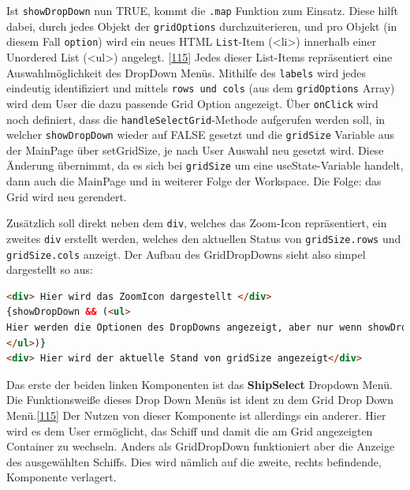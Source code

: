 \documentclass[
    headings=optiontotocandhead,%
    twoside,
    numbers=noenddot,%
    12pt, %
    titlepage, %
    parskip=full, %
    listof=leveldown, 
    numbers=noenddot, %
    a4paper,DIV=14,
    BCOR=15mm,
]{scrbook}
\newcommand{\passthrough}[1]{#1}
\begin{document}
Ist \passthrough{\lstinline!showDropDown!} nun TRUE, kommt die
\passthrough{\lstinline!.map!} Funktion zum Einsatz. Diese hilft dabei,
durch jedes Objekt der \passthrough{\lstinline!gridOptions!}
durchzuiterieren, und pro Objekt (in diesem Fall
\passthrough{\lstinline!option!}) wird ein neues HTML
\passthrough{\lstinline!List!}-Item (\textless li\textgreater) innerhalb
einer Unordered List (\textless ul\textgreater) angelegt.
{[}\protect\hyperlink{ref-Ionos-JS-map}{115}{]} Jedes dieser List-Items
repräsentiert eine Auswahlmöglichkeit des DropDown Menüs. Mithilfe des
\passthrough{\lstinline!labels!} wird jedes eindeutig identifiziert und
mittels \passthrough{\lstinline!rows und cols!} (aus dem
\passthrough{\lstinline!gridOptions!} Array) wird dem User die dazu
passende Grid Option angezeigt. Über \passthrough{\lstinline!onClick!}
wird noch definiert, dass die
\passthrough{\lstinline!handleSelectGrid!}-Methode aufgerufen werden
soll, in welcher \passthrough{\lstinline!showDropDown!} wieder auf FALSE
gesetzt und die \passthrough{\lstinline!gridSize!} Variable aus der
MainPage über setGridSize, je nach User Auswahl neu gesetzt wird. Diese
Änderung übernimmt, da es sich bei \passthrough{\lstinline!gridSize!} um
eine useState-Variable handelt, dann auch die MainPage und in weiterer
Folge der Workspace. Die Folge: das Grid wird neu gerendert.

Zusätzlich soll direkt neben dem \passthrough{\lstinline!div!}, welches
das Zoom-Icon repräsentiert, ein zweites \passthrough{\lstinline!div!}
erstellt werden, welches den aktuellen Status von
\passthrough{\lstinline!gridSize.rows!} und
\passthrough{\lstinline!gridSize.cols!} anzeigt. Der Aufbau des
GridDropDowns sieht also simpel dargestellt so aus:

\begin{lstlisting}[language=HTML, caption={HTML Aufbau GridDropDown}]
<div> Hier wird das ZoomIcon dargestellt </div>
{showDropDown && (<ul> 
Hier werden die Optionen des DropDowns angezeigt, aber nur wenn showDropDown positiv ist 
</ul>)}
<div> Hier wird der aktuelle Stand von gridSize angezeigt</div>
\end{lstlisting}

Das erste der beiden linken Komponenten ist das \textbf{ShipSelect}
Dropdown Menü. Die Funktionsweiße dieses Drop Down Menüs ist ident zu
dem Grid Drop Down Menü.{[}\protect\hyperlink{ref-Ionos-JS-map}{115}{]}
Der Nutzen von dieser Komponente ist allerdings ein anderer. Hier wird
es dem User ermöglicht, das Schiff und damit die am Grid angezeigten
Container zu wechseln. Anders als GridDropDown funktioniert aber die
Anzeige des ausgewählten Schiffs. Dies wird nämlich auf die zweite,
rechts befindende, Komponente verlagert.
\end{document}
